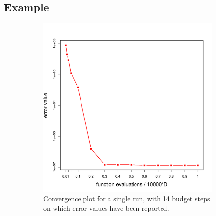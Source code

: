 \documentclass[hyperref={pdfpagelabels=false}]{beamer}
\begin{document}
\begin{frame}
\subsection{Example}
%
\begin{figure}
\captionsetup[subfigure]{labelformat=empty}
\centering
\begin{subfigure}{0.49\textwidth}
\centering
\includegraphics[width = \textwidth]{DESConvergence.pdf}
\caption{Convergence plot for a single run, with 14 budget steps on which error values have been reported. }
\label{fig:left}
\end{subfigure}
\begin{subfigure}{0.49\textwidth}
\vspace{-5mm}
\centering

\end{subfigure}
\end{figure}
\end{frame}
\end{document}
